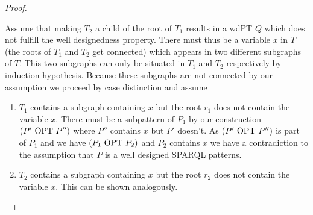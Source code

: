 \begin{proof}
\begin{enumerate}
\begin{enumerate}
					Assume that making $T_2$ a child of the root of $T_1$ 
					results in a wdPT $Q$ which does not fulfill the well designedness property.
					There must thus be a variable $x$ in $T$ (the roots of $T_1$
					and $T_2$ get connected) which appears in two different subgraphs of $T$. This
					two subgraphs can only be situated in $T_1$ and $T_2$ respectively by induction
					hypothesis.	Because these subgraphs are not connected 
					by our assumption we proceed by	case distinction and assume 
					\begin{enumerate}
						\item $T_1$ contains a subgraph containing $x$ but the root $r_1$ does not
							contain the variable $x$. There must be a subpattern of $P_1$ by our
							construction $(P' \mbox{ OPT } P'')$ where $P''$ contains $x$ but $P'$ doesn't. 
							As $(P' \mbox{ OPT } P'')$ is part of $P_1$ 
							and we have $(P_1 \mbox{ OPT } P_2)$ and $P_2$ contains $x$ we have a
							contradiction to the assumption that $P$ is a well designed SPARQL
							patterns.
						\item $T_2$ contains a subgraph containing $x$ but the root $r_2$ does not
							contain the variable $x$. This can be shown
							analogously. %
					\end{enumerate}




\end{enumerate}
\end{enumerate}
\end{proof}
